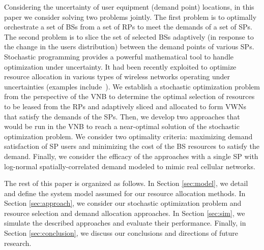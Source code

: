 \documentclass[conference]{IEEEtran}
\begin{document}
Considering the uncertainty of user equipment (demand point) locations, in this paper we consider solving two problems jointly.  The first problem is to optimally orchestrate a set of BSs from a set of RPs to meet the demands of a set of SPs.  The second problem is to slice the set of selected BSs adaptively (in response to the change in the users distribution) between the demand points of various SPs.  Stochastic programming provides a powerful mathematical tool to handle optimization under uncertainty.  It had been recently exploited to optimize resource allocation in various types of wireless networks operating under uncertainties (examples include~\cite{MJ_TW_13, CC_OFDMA, MJ_MECOMM_17, MJ_CCNC_16, MJ_WCNC_16, MJ_DySPAN_15, CC_video}).  We establish a stochastic optimization problem from the perspective of the VNB to determine the optimal selection of resources to be leased from the RPs and adaptively sliced and allocated to form VWNs that satisfy the demands of the SPs.  Then, we develop two approaches that would be run in the VNB to reach a near-optimal solution of the stochastic optimization problem.  We consider two optimality criteria: maximizing demand satisfaction of SP users and minimizing the cost of the BS resources to satisfy the demand.  Finally, we consider the efficacy of the approaches with a single SP with log-normal spatially-correlated demand modeled to mimic real cellular networks.

The rest of this paper is organized as follows.  In Section \ref{sec:model}, we detail and define the system model assumed for our resource allocation methods.  In Section \ref{sec:approach}, we consider our stochastic optimization problem and resource selection and demand allocation approaches.  In Section \ref{sec:sim}, we simulate the described approaches and evaluate their performance.  Finally, in Section \ref{sec:conclusion}, we discuss our conclusions and directions of future research.

%
%
\end{document}

